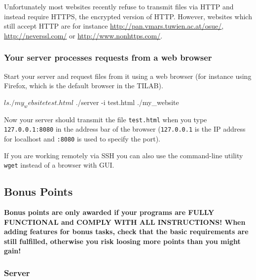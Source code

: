 Unfortunately most websites recently refuse to transmit files via HTTP
and instead require HTTPS, the encrypted version of HTTP.
However, websites which still accept HTTP are for instance
\url{http://pan.vmars.tuwien.ac.at/osue/},
\url{http://neverssl.com/} or \url{http://www.nonhttps.com/}.

\subsubsection*{Your server processes requests from a web browser}

\vspace{-4mm}
Start your server and request files from it using a web browser
(for instance using Firefox, which is the default browser in the TILAB).

\begin{osuefmtcode}
    $ ls ./my_website
    test.html
    $ ./server -i test.html ./my_website
\end{osuefmtcode}

Now your server should transmit the file \verb|test.html|
when you type \verb|127.0.0.1:8080| in the address bar of the browser
(\verb|127.0.0.1| is the IP address for localhost
and \verb|:8080| is used to specify the port).

If you are working remotely via SSH
you can also use the command-line utility \verb|wget|
instead of a browser with GUI.

\clearpage
\subsection*{Bonus Points}

\vspace{-3mm}
\textbf{Bonus points are only awarded
if your programs are FULLY FUNCTIONAL
and COMPLY WITH ALL INSTRUCTIONS!
When adding features for bonus tasks,
check that the basic requirements are still fulfilled,
otherwise you risk loosing more points than you might gain!
}

\subsubsection*{Server}

